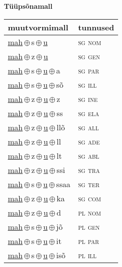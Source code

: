 

\vspace{3.5em}
\noindent \begin{minipage}{\textwidth}
\noindent \textbf{Tüüpsõnamall \,}\\

\begin{sideways}
\begin{tabular}{l l}
muutvormimall & tunnused \\
\hline
\underline{mah}\,$\oplus$\,s\,$\oplus$\,\underline{u} & \textsc{ sg nom } \\
\underline{mah}\,$\oplus$\,z\,$\oplus$\,\underline{u} & \textsc{ sg gen } \\
\underline{mah}\,$\oplus$\,s\,$\oplus$\,\underline{u}\,$\oplus$\,a & \textsc{ sg par } \\
\underline{mah}\,$\oplus$\,s\,$\oplus$\,\underline{u}\,$\oplus$\,sõ & \textsc{ sg ill } \\
\underline{mah}\,$\oplus$\,z\,$\oplus$\,\underline{u}\,$\oplus$\,z & \textsc{ sg ine } \\
\underline{mah}\,$\oplus$\,z\,$\oplus$\,\underline{u}\,$\oplus$\,ss & \textsc{ sg ela } \\
\underline{mah}\,$\oplus$\,z\,$\oplus$\,\underline{u}\,$\oplus$\,llõ & \textsc{ sg all } \\
\underline{mah}\,$\oplus$\,z\,$\oplus$\,\underline{u}\,$\oplus$\,ll & \textsc{ sg ade } \\
\underline{mah}\,$\oplus$\,z\,$\oplus$\,\underline{u}\,$\oplus$\,lt & \textsc{ sg abl } \\
\underline{mah}\,$\oplus$\,z\,$\oplus$\,\underline{u}\,$\oplus$\,ssi & \textsc{ sg tra } \\
\underline{mah}\,$\oplus$\,s\,$\oplus$\,\underline{u}\,$\oplus$\,ssaa & \textsc{ sg ter } \\
\underline{mah}\,$\oplus$\,z\,$\oplus$\,\underline{u}\,$\oplus$\,ka & \textsc{ sg com } \\
\underline{mah}\,$\oplus$\,z\,$\oplus$\,\underline{u}\,$\oplus$\,d & \textsc{ pl nom } \\
\underline{mah}\,$\oplus$\,s\,$\oplus$\,\underline{u}\,$\oplus$\,jõ & \textsc{ pl gen } \\
\underline{mah}\,$\oplus$\,s\,$\oplus$\,\underline{u}\,$\oplus$\,it & \textsc{ pl par } \\
\underline{mah}\,$\oplus$\,s\,$\oplus$\,\underline{u}\,$\oplus$\,isõ & \textsc{ pl ill } \\

\end{tabular}
\end{sideways}
\end{minipage}
